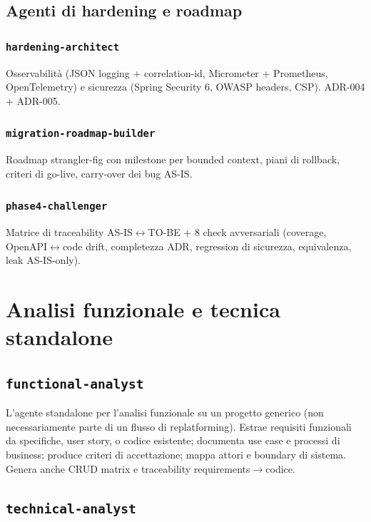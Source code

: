 \documentclass[12pt,a4paper,twoside]{book}
\begin{document}
\section{Agenti di hardening e roadmap}

\subsection{\texttt{hardening-architect}}
Osservabilità (JSON logging + correlation-id, Micrometer + Prometheus, OpenTelemetry) e sicurezza (Spring Security 6, OWASP headers, CSP). ADR-004 + ADR-005.

\subsection{\texttt{migration-roadmap-builder}}
Roadmap strangler-fig con milestone per bounded context, piani di rollback, criteri di go-live, carry-over dei bug AS-IS.

\subsection{\texttt{phase4-challenger}}
Matrice di traceability AS-IS$\leftrightarrow$TO-BE + 8 check avversariali (coverage, OpenAPI$\leftrightarrow$code drift, completezza ADR, regression di sicurezza, equivalenza, leak AS-IS-only).

\chapter{Analisi funzionale e tecnica standalone}

\section{\texttt{functional-analyst}}

L'agente standalone per l'analisi funzionale su un progetto generico (non necessariamente parte di un flusso di replatforming). Estrae requisiti funzionali da specifiche, user story, o codice esistente; documenta use case e processi di business; produce criteri di accettazione; mappa attori e boundary di sistema. Genera anche CRUD matrix e traceability requirements$\rightarrow$codice.

\section{\texttt{technical-analyst}}
\end{document}
